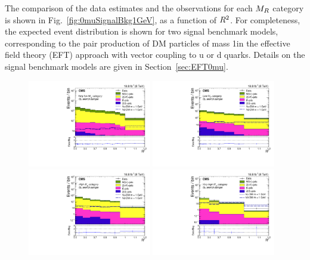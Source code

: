 The comparison of the data estimates and the observations for
each $M_R$ category is shown in
Fig.~\ref{fig:0muSignalBkg1GeV}, as a function of $R^2$. For
completeness, the expected event distribution is shown for two signal
benchmark models, corresponding to the pair production of DM particles
of mass 1\GeV in the effective field theory (EFT) approach with vector coupling to u or d quarks. Details on the signal benchmark models are
given in Section~\ref{sec:EFT0mu}.
\begin{figure}
 \centering
   \includegraphics[width=0.48\textwidth]{SignalBkgPlots/Data_MC_cat1_1_DoubleSignal_V.pdf}
   \includegraphics[width=0.48\textwidth]{SignalBkgPlots/Data_MC_cat2_1_DoubleSignal_V.pdf}
   \includegraphics[width=0.48\textwidth]{SignalBkgPlots/Data_MC_cat3_1_DoubleSignal_V.pdf}
   \includegraphics[width=0.48\textwidth]{SignalBkgPlots/Data_MC_cat4_1_DoubleSignal_V.pdf}

\end{figure}
